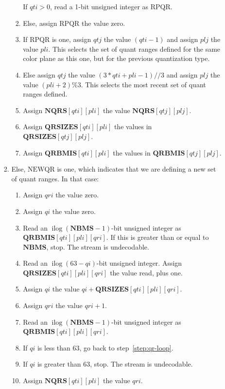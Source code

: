 \documentclass[9pt,letterpaper]{book}
\newcommand{\idx}[1]{{\ensuremath{\mathit{#1}}}}
\newcommand{\qti}{\idx{qti}}
\newcommand{\qtj}{\idx{qtj}}
\newcommand{\pli}{\idx{pli}}
\newcommand{\plj}{\idx{plj}}
\newcommand{\qi}{\idx{qi}}
\newcommand{\qri}{\idx{qri}}
\newcommand{\bitvar}[1]{\ensuremath{\mathbf{\bm{#1}}}}
\newcommand{\locvar}[1]{\ensuremath{\mathrm{#1}}}
\newcommand{\ilog}{\ensuremath{\mathop{\mathrm{ilog}}\nolimits}}
\numberwithin{equation}{chapter}
\numberwithin{figure}{chapter}
\numberwithin{table}{chapter}
\begin{document}
\begin{enumerate}
\begin{enumerate}
\begin{enumerate}
\begin{enumerate}
If $\locvar{\qti}>0$, read a 1-bit unsigned integer as \locvar{RPQR}.
\item
Else, assign \locvar{RPQR} the value zero.
\item
If \locvar{RPQR} is one, assign \locvar{\qtj} the value $(\locvar{\qti}-1)$
 and assign \locvar{\plj} the value \locvar{\pli}.
This selects the set of quant ranges defined for the same color plane as this
 one, but for the previous quantization type.
\item
Else assign \locvar{\qtj} the value $(3*\locvar{\qti}+\locvar{\pli}-1)//3$ and
 assign \locvar{\plj} the value $(\locvar{\pli}+2)\%3$.
This selects the most recent set of quant ranges defined.
\item
Assign $\bitvar{NQRS}[\locvar{\qti}][\locvar{\pli}]$ the value
 $\bitvar{NQRS}[\locvar{\qtj}][\locvar{\plj}]$.
\item
Assign $\bitvar{QRSIZES}[\locvar{\qti}][\locvar{\pli}]$ the values in 
 $\bitvar{QRSIZES}[\locvar{\qtj}][\locvar{\plj}]$.
\item
Assign $\bitvar{QRBMIS}[\locvar{\qti}][\locvar{\pli}]$ the values in
 $\bitvar{QRBMIS}[\locvar{\qtj}][\locvar{\plj}]$.
\end{enumerate}
\item
Else, \locvar{NEWQR} is one, which indicates that we are defining a new set of
 quant ranges.
In that case:
\begin{enumerate}
\item
Assign $\locvar{\qri}$ the value zero.
\item
Assign $\locvar{\qi}$ the value zero.
\item
Read an $\ilog(\bitvar{NBMS}-1)$-bit unsigned integer as\\
 $\bitvar{QRBMIS}[\locvar{\qti}][\locvar{\pli}][\locvar{\qri}]$.
If this is greater than or equal to \bitvar{NBMS}, stop.
The stream is undecodable.
\item
\label{step:qr-loop}
Read an $\ilog(63-\locvar{\qi})$-bit unsigned integer.
Assign\\ $\bitvar{QRSIZES}[\locvar{\qti}][\locvar{\pli}][\locvar{\qri}]$ the value
 read, plus one.
\item
Assign \locvar{\qi} the value $\locvar{\qi}+
 \bitvar{QRSIZES}[\locvar{\qti}][\locvar{\pli}][\locvar{\qri}]$.
\item
Assign \locvar{\qri} the value $\locvar{\qri}+1$.
\item
Read an $\ilog(\bitvar{NBMS}-1)$-bit unsigned integer as\\
 $\bitvar{QRBMIS}[\locvar{\qti}][\locvar{\pli}][\locvar{\qri}]$.
\item
If \locvar{\qi} is less than 63, go back to step~\ref{step:qr-loop}.
\item
If \locvar{\qi} is greater than 63, stop.
The stream is undecodable.
\item
Assign $\bitvar{NQRS}[\locvar{\qti}][\locvar{\pli}]$ the value \locvar{\qri}.
\end{enumerate}
\end{enumerate}
\end{enumerate}
\end{enumerate}
\end{document}
